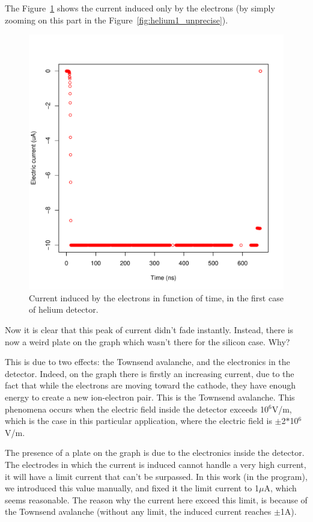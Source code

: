 \documentclass[11pt]{article}
\begin{document}
				The Figure~\ref{fig:helium1_precise} shows the current induced only by the electrons (by simply zooming
				on this part in the Figure~\ref{fig:helium1_unprecise}).

				\begin{figure}[H]
				  \center
				  \includegraphics[scale=0.5]{images/applications/helium1_precise.pdf}
				  \caption{Current induced by the electrons in function of time, in the first case of helium detector.}
				  \label{fig:helium1_precise}
				\end{figure}

				Now it is clear that this peak of current didn't fade instantly. Instead, there is now a weird plate
				on the graph which wasn't there for the silicon case. Why?

				This is due to two effects: the Townsend avalanche, and the electronics in the detector. Indeed, on the graph
				there is firstly an increasing current, due to the fact that while the electrons are moving toward the cathode,
				they have enough energy to create a new ion-electron pair. This is the Townsend avalanche. This phenomena occurs
				when the electric field inside the detector exceeds 10$^6$V/m, which is the case in this particular application,
				where the electric field is $\pm$2$*$10$^6$V/m.

				The presence of a plate on the graph is due to the electronics inside the detector. The electrodes in which the
				current is induced cannot handle a very high current, it will have a limit current that can't be surpassed.
				In this work (in the program), we introduced this value manually, and fixed it the limit current to 1$\mu$A,
				which seems reasonable. The reason why the current here exceed this limit, is because of the Townsend avalanche
				(without any limit, the induced current reaches $\pm$1A).
\end{document}
